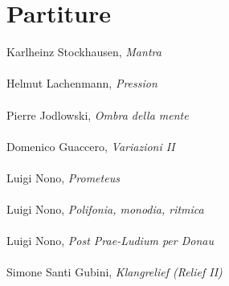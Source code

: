
\chapter{Partiture}
\label{chp:Partiture}
\noindent Karlheinz Stockhausen, \textit{Mantra} \\
\\
Helmut Lachenmann, \textit{Pression} \\
\\
Pierre Jodlowski, \textit{Ombra della mente} \\
\\
Domenico Guaccero, \textit{Variazioni II} \\
\\
Luigi Nono, \textit{Prometeus} \\
\\
Luigi Nono, \textit{Polifonia, monodia, ritmica} \\
\\
Luigi Nono, \textit{Post Prae-Ludium per Donau} \\
\\
Simone Santi Gubini, \textit{Klangrelief (Relief II)} \\
